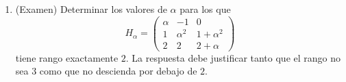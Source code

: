 \begin{enumerate}[label=\textbf{\arabic*.},leftmargin=*]
\item (Examen) Determinar los valores de $\alpha$ para los que
\[
H_\alpha=
\begin{pmatrix}
\alpha&-1&0\\
1&\alpha^2&1+\alpha^2\\
2&2&2+\alpha
\end{pmatrix}
\]
tiene rango exactamente $2$. La respuesta debe justificar tanto que el rango no sea $3$ como que no descienda por debajo de $2$.

\end{enumerate}
